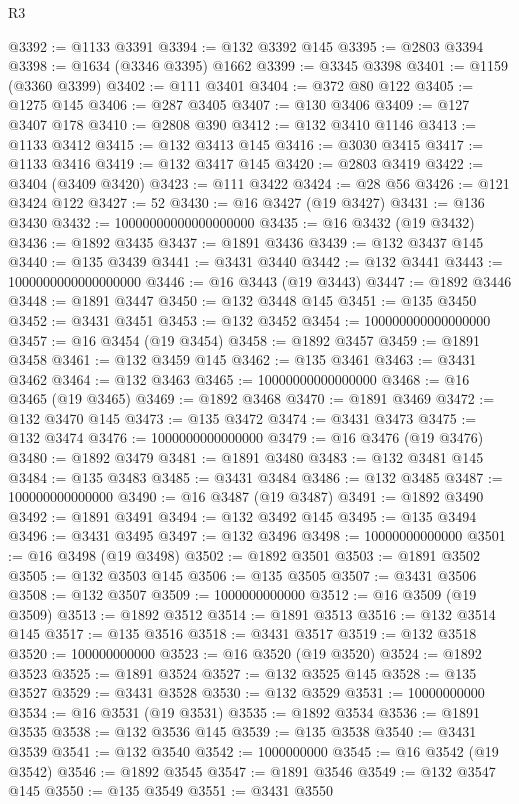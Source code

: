 \begin{lexlean}{R3}
\begin{coremodule}
@3392 := @1133 @3391
@3394 := @132 @3392 @145
@3395 := @2803 @3394
@3398 := @1634 (@3346 @3395) @1662
@3399 := @3345 @3398
@3401 := @1159 (@3360 @3399)
@3402 := @111 @3401
@3404 := @372 @80 @122
@3405 := @1275 @145
@3406 := @287 @3405
@3407 := @130 @3406
@3409 := @127 @3407 @178
@3410 := @2808 @390
@3412 := @132 @3410 @1146
@3413 := @1133 @3412
@3415 := @132 @3413 @145
@3416 := @3030 @3415
@3417 := @1133 @3416
@3419 := @132 @3417 @145
@3420 := @2803 @3419
@3422 := @3404 (@3409 @3420)
@3423 := @111 @3422
@3424 := @28 @56
@3426 := @121 @3424 @122
@3427 := 52
@3430 := @16 @3427 (@19 @3427)
@3431 := @136 @3430
@3432 := 10000000000000000000
@3435 := @16 @3432 (@19 @3432)
@3436 := @1892 @3435
@3437 := @1891 @3436
@3439 := @132 @3437 @145
@3440 := @135 @3439
@3441 := @3431 @3440
@3442 := @132 @3441
@3443 := 1000000000000000000
@3446 := @16 @3443 (@19 @3443)
@3447 := @1892 @3446
@3448 := @1891 @3447
@3450 := @132 @3448 @145
@3451 := @135 @3450
@3452 := @3431 @3451
@3453 := @132 @3452
@3454 := 100000000000000000
@3457 := @16 @3454 (@19 @3454)
@3458 := @1892 @3457
@3459 := @1891 @3458
@3461 := @132 @3459 @145
@3462 := @135 @3461
@3463 := @3431 @3462
@3464 := @132 @3463
@3465 := 10000000000000000
@3468 := @16 @3465 (@19 @3465)
@3469 := @1892 @3468
@3470 := @1891 @3469
@3472 := @132 @3470 @145
@3473 := @135 @3472
@3474 := @3431 @3473
@3475 := @132 @3474
@3476 := 1000000000000000
@3479 := @16 @3476 (@19 @3476)
@3480 := @1892 @3479
@3481 := @1891 @3480
@3483 := @132 @3481 @145
@3484 := @135 @3483
@3485 := @3431 @3484
@3486 := @132 @3485
@3487 := 100000000000000
@3490 := @16 @3487 (@19 @3487)
@3491 := @1892 @3490
@3492 := @1891 @3491
@3494 := @132 @3492 @145
@3495 := @135 @3494
@3496 := @3431 @3495
@3497 := @132 @3496
@3498 := 10000000000000
@3501 := @16 @3498 (@19 @3498)
@3502 := @1892 @3501
@3503 := @1891 @3502
@3505 := @132 @3503 @145
@3506 := @135 @3505
@3507 := @3431 @3506
@3508 := @132 @3507
@3509 := 1000000000000
@3512 := @16 @3509 (@19 @3509)
@3513 := @1892 @3512
@3514 := @1891 @3513
@3516 := @132 @3514 @145
@3517 := @135 @3516
@3518 := @3431 @3517
@3519 := @132 @3518
@3520 := 100000000000
@3523 := @16 @3520 (@19 @3520)
@3524 := @1892 @3523
@3525 := @1891 @3524
@3527 := @132 @3525 @145
@3528 := @135 @3527
@3529 := @3431 @3528
@3530 := @132 @3529
@3531 := 10000000000
@3534 := @16 @3531 (@19 @3531)
@3535 := @1892 @3534
@3536 := @1891 @3535
@3538 := @132 @3536 @145
@3539 := @135 @3538
@3540 := @3431 @3539
@3541 := @132 @3540
@3542 := 1000000000
@3545 := @16 @3542 (@19 @3542)
@3546 := @1892 @3545
@3547 := @1891 @3546
@3549 := @132 @3547 @145
@3550 := @135 @3549
@3551 := @3431 @3550

\end{coremodule}
\end{lexlean}
